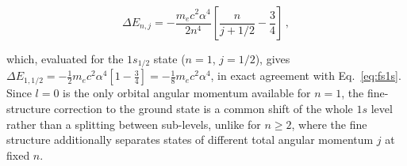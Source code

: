 \begin{appendices}
\begin{equation}
\Delta E_{n,j} = -\frac{m_e c^2 \alpha^4}{2n^4} \left[ \frac{n}{j+1/2} - \frac{3}{4} \right] \, ,
\end{equation}

which, evaluated for the $1s_{1/2}$ state ($n=1$, $j=1/2$), gives $\Delta E_{1,1/2} = -\frac{1}{2} m_e c^2 \alpha^4 \left[ 1 - \frac{3}{4} \right] = -\frac{1}{8} m_e c^2 \alpha^4$, in exact agreement with Eq.~\eqref{eq:fs1s}. Since $l=0$ is the only orbital angular momentum available for $n=1$, the fine-structure correction to the ground state is a common shift of the whole $1s$ level rather than a splitting between sub-levels, unlike for $n \geq 2$, where the fine structure additionally separates states of different total angular momentum $j$ at fixed $n$.

\end{appendices}